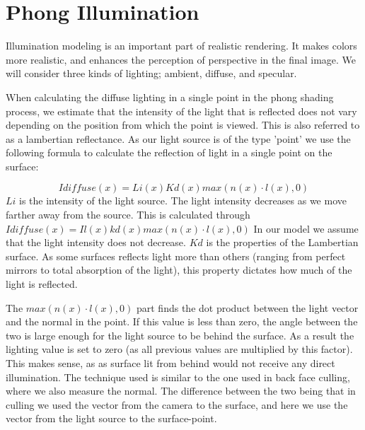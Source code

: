 \section{Phong Illumination}
Illumination modeling is an important part of realistic rendering. It makes
colors more realistic, and enhances the perception of perspective in the final
image.
We will consider three kinds of lighting; ambient, diffuse, and specular.



When calculating the diffuse lighting in a single point in the phong shading process, we estimate that the intensity of the light that is reflected does not vary depending on the position from which the point is viewed.  This is also referred to as a lambertian reflectance. 
As our light source is of the type 'point' we use the following formula to calculate the reflection of light in a single point on the surface:

$$Idiffuse(x) = Li(x) Kd(x) max(n(x) · l(x), 0)$$
$Li$ is the intensity of the light source. The light intensity decreases as we move farther away from the source. This is calculated through 
$Idiffuse(x) = Il(x) kd(x) max(n(x) · l(x), 0)$
In our model we assume that the light intensity does not decrease.
$Kd$ is the properties of the Lambertian surface. As some surfaces reflects light more than others (ranging from perfect mirrors to total absorption of the light), this property dictates how much of the light is reflected.

The $max(n(x) · l(x), 0)$ part finds the dot product between the light vector and the normal in the point. If this value is less than zero, the angle between the two is large enough for the light source to be behind the surface. As a result the lighting value is set to zero (as all previous values are multiplied by this factor). This makes sense, as as surface lit from behind would not receive any direct illumination. The technique used is similar to the one used in back face culling, where we also measure the normal. The difference between the two being that in culling we used the vector from the camera to the surface, and here we use the vector from the light source to the surface-point. 



